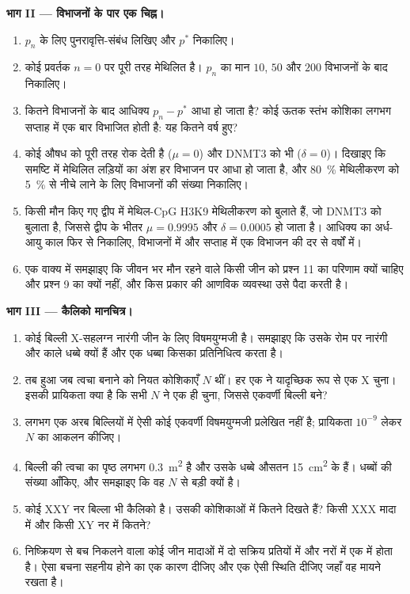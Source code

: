 \begin{problem}
\medskip
\noindent\textbf{भाग II --- विभाजनों के पार एक चिह्न।}
\begin{enumerate}[resume]
  \item $p_{n}$ के लिए पुनरावृत्ति-संबंध लिखिए और $p^{*}$ निकालिए।
  \item कोई प्रवर्तक  $n = 0$ पर पूरी तरह मेथिलित है। $p_{n}$ का
        मान $10$, $50$ और $200$ विभाजनों के बाद निकालिए।
  \item कितने विभाजनों के बाद आधिक्य $p_{n} - p^{*}$ आधा हो जाता है?
        कोई ऊतक स्तंभ कोशिका लगभग सप्ताह में एक बार विभाजित होती है:
        यह कितने वर्ष हुए?
  \item कोई औषध  को पूरी तरह रोक देती है ($\mu = 0$) और DNMT3 को
        भी ($\delta = 0$)। दिखाइए कि समष्टि में मेथिलित लड़ियों का अंश
        हर विभाजन पर आधा हो जाता है, और \qty{80}{\%} मेथिलीकरण को
        \qty{5}{\%} से नीचे लाने के लिए विभाजनों की संख्या निकालिए।
  \item किसी मौन किए गए द्वीप में मेथिल-CpG  H3K9 मेथिलीकरण को
        बुलाते हैं, जो DNMT3 को बुलाता है, जिससे द्वीप के भीतर
        $\mu = 0.9995$ और $\delta = 0.0005$ हो जाता है। आधिक्य का
        अर्ध-आयु काल फिर से निकालिए, विभाजनों में और सप्ताह में एक
        विभाजन की दर से वर्षों में।
  \item एक वाक्य में समझाइए कि जीवन भर मौन रहने वाले किसी जीन को
        प्रश्न 11 का परिणाम क्यों चाहिए और प्रश्न 9 का क्यों नहीं, और
        किस प्रकार की आणविक व्यवस्था उसे पैदा करती है।
\end{enumerate}

\medskip
\noindent\textbf{भाग III --- कैलिको मानचित्र।}
\begin{enumerate}[resume]
  \item कोई बिल्ली X-सहलग्न नारंगी जीन के लिए विषमयुग्मजी है। समझाइए
        कि उसके रोम पर नारंगी और काले धब्बे क्यों हैं और एक धब्बा
        किसका प्रतिनिधित्व करता है।
  \item {} तब हुआ जब त्वचा बनाने को नियत कोशिकाएँ $N$ थीं।
        हर एक ने यादृच्छिक रूप से एक X चुना। इसकी प्रायिकता क्या है कि
        सभी $N$ ने एक ही चुना, जिससे एकवर्णी बिल्ली बने?
  \item लगभग एक अरब बिल्लियों में ऐसी कोई एकवर्णी विषमयुग्मजी प्रलेखित
        नहीं है; प्रायिकता $10^{-9}$ लेकर $N$ का आकलन कीजिए।
  \item बिल्ली की त्वचा का पृष्ठ लगभग \qty{0.3}{m^2} है और उसके धब्बे
        औसतन \qty{15}{cm^2} के हैं। धब्बों की संख्या आँकिए, और समझाइए
        कि वह $N$ से बड़ी क्यों है।
  \item कोई XXY नर बिल्ला भी कैलिको है। उसकी कोशिकाओं में कितने  दिखते हैं? किसी XXX मादा में और किसी XY नर में कितने?
  \item निष्क्रियण से बच निकलने वाला कोई जीन मादाओं में दो सक्रिय
        प्रतियों में और नरों में एक में होता है। ऐसा बचना सहनीय होने
        का एक कारण दीजिए और एक ऐसी स्थिति दीजिए जहाँ वह मायने रखता है।
\end{enumerate}


\end{problem}
